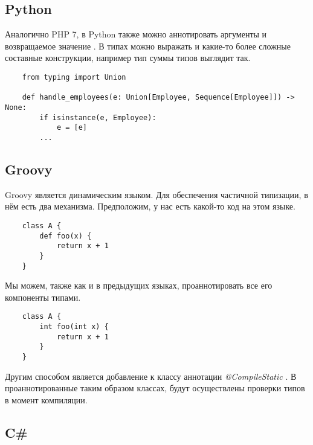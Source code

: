 \subsection{Python}
Аналогично PHP 7, в Python также можно аннотировать аргументы и возвращаемое значение \cite{wiki:pythonPep484TypeHints}. В типах можно выражать и какие-то более сложные составные конструкции, например тип суммы типов выглядит так.
\begin{verbatim}
    from typing import Union
    
    def handle_employees(e: Union[Employee, Sequence[Employee]]) -> None:
        if isinstance(e, Employee):
            e = [e]
        ...
\end{verbatim}

\subsection{Groovy}

Groovy является динамическим языком. Для обеспечения частичной типизации, в нём есть два механизма. Предположим, у нас есть какой-то код на этом языке.

\begin{verbatim}
    class A {
        def foo(x) {
            return x + 1
        }
    }
\end{verbatim}

Мы можем, также как и в предыдущих языках, проаннотировать все его компоненты типами.

\begin{verbatim}
    class A {
        int foo(int x) {
            return x + 1
        }
    }
\end{verbatim}

Другим способом является добавление к классу аннотации \textit{@CompileStatic} \cite{groovy:compileStatic}. В проаннотированные таким образом классах, будут осуществлены проверки типов в момент компиляции.



\subsection{C{\#}}

